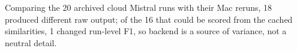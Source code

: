 Comparing the 20 archived cloud Mistral runs with their Mac reruns, 18 produced different raw output; of the 16 that could be scored from the cached similarities, 1 changed run-level F1, so backend is a source of variance, not a neutral detail.%
